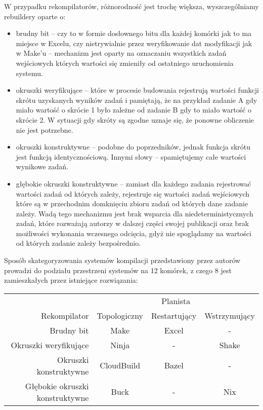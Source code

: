 W przypadku rekompilatorów, różnorodność jest trochę większa, wyszczególniamy rebuildery oparte o:
\begin{itemize}
\item brudny bit -- czy to w formie dosłownego bitu dla każdej komórki jak to ma miejsce w Excelu, czy nietrywialnie przez weryfikowanie dat modyfikacji jak w Make'u -- mechanizm jest oparty na oznaczaniu wszystkich zadań wejściowych których wartości się zmieniły od ostatniego uruchomienia systemu.
\item okruszki weryfikujące -- które w procesie budowania rejestrują wartości funkcji skrótu uzyskanych wyników zadań i pamiętają, że na przykład zadanie A gdy miało wartość o skrócie 1 było zależne od zadanie B gdy to miało wartość o skrócie 2. W sytuacji gdy skróty są zgodne uznaje się, że ponowne obliczenie nie jest potrzebne.
\item okruszki konstruktywne -- podobne do poprzedników, jednak funkcja skrótu jest funkcją identycznościową. Innymi słowy -- spamiętujemy całe wartości wynikowe zadań.
\item głębokie okruszki konstruktywne -- zamiast dla każdego zadania rejestrować wartości zadań od których zależy, rejestruje się wartości zadań wejściowych które są w przechodnim domknięciu zbioru zadań od których dane zadanie zależy. Wadą tego mechanizmu jest brak wsparcia dla niedeterministycznych zadań, które rozważają autorzy w dalszej części swojej publikacji oraz brak możliwości wykonania wczesnego odcięcia, gdyż nie spoglądamy na wartości od których zadanie zależy bezpośrednio.
\end{itemize}

Sposób skategoryzowania systemów kompilacji przedstawiony przez autorów prowadzi do podziału przestrzeni systemów na 12 komórek, z czego 8 jest zamieszkałych przez istniejące rozwiązania:

\begin{tabular}{r | c c c}
\hline
                                & \multicolumn{3}{c}{Planista} \\
Rekompilator                    & Topologiczny & Restartujący & Wstrzymujący \\
\hline
Brudny bit                      & Make         & Excel        & - \\
Okruszki weryfikujące           & Ninja        & -            & Shake \\
Okruszki konstruktywne          & CloudBuild   & Bazel        & -\\
Głębokie okruszki konstruktywne & Buck         & -            & Nix \\
\hline
\end{tabular}

